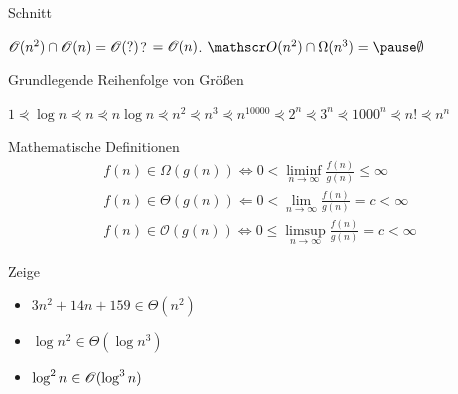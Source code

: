 \documentclass[handout]{beamer}
\begin{document}
\begin{frame}{Schnitt}
\begin{itemize}
\pitem $\mathscr{O} (n^2) \cap \mathscr{O}(n) = \mathscr{O}(?)$? \pause $= \mathscr{O}(n)$.
\pitem $\okalk(n^2) \cap \Omega(n^3) = \pause \emptyset$
\end{itemize}
\end{frame}

\begin{frame}{Grundlegende Reihenfolge von Größen}
\begin{center}
$1 \curlyeqprec \log n \curlyeqprec n \curlyeqprec n \log n \curlyeqprec n^2 \curlyeqprec n^3 \curlyeqprec n^{10000} \curlyeqprec 2^n \curlyeqprec 3^n \curlyeqprec 1000^n \curlyeqprec n! \curlyeqprec n^n$
\end{center}
\end{frame}

\begin{frame}{Mathematische Definitionen}
\begin{align*}
f(n) \in \Omega(g(n)) \Leftrightarrow 0 < \liminf_{n \rightarrow \infty} \frac{f(n)}{g(n)} \leq \infty\\
f(n) \in \Theta(g(n)) \Leftarrow  0 <  \lim_{n \rightarrow \infty} \frac{f(n)}{g(n)} = c < \infty\\
f(n) \in \mathcal{O}(g(n)) \Leftrightarrow 0 \leq \limsup_{n \rightarrow \infty} \frac{f(n)}{g(n)} = c < \infty
\end{align*}

\bp

\begin{taskblock}{Zeige}
\begin{itemize}
\item $3n^2 + 14n + 159 \in \Theta(n^2)$ %
\item $\log n^2 \in \Theta(\log n^3)$ %
\item $\log^2 n \in \mathscr{O}(\log^3 n)$ %
\end{itemize}
\end{taskblock}
\end{frame}


\end{document}
